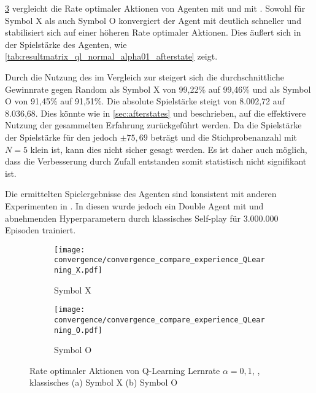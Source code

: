 \cref{fig:convergence_compare_experience_QLearning} vergleicht die Rate optimaler Aktionen von Agenten mit \qtable und mit \wtable. 
Sowohl für Symbol X als auch Symbol O konvergiert der Agent mit \wtable deutlich schneller und stabilisiert sich auf einer höheren Rate optimaler Aktionen. 
Dies äußert sich in der Spielstärke des Agenten, wie \cref{tab:resultmatrix_ql_normal_alpha01_afterstate} zeigt.

Durch die Nutzung des \wtable im Vergleich zur \qtable steigert sich die durchschnittliche Gewinnrate gegen Random als Symbol X von 99,22\% auf 99,46\% und als Symbol O von 91,45\% auf 91,51\%.
Die absolute Spielstärke steigt von 8.002,72 auf 8.036,68. 
Dies könnte wie in \cref{sec:afterstates} und \cite[S. 136f.]{suttonReinforcementLearningIntroduction2018} beschrieben, auf die effektivere Nutzung der gesammelten Erfahrung zurückgeführt werden.
Da die Spielstärke der Spielstärke für den \qtable jedoch $\pm 75,69$ beträgt und die Stichprobenanzahl mit $N=5$ klein ist, kann dies nicht sicher gesagt werden.
Es ist daher auch möglich, dass die Verbesserung durch Zufall entstanden somit statistisch nicht signifikant ist.

Die ermittelten Spielergebnisse des \qlearning Agenten sind konsistent mit anderen Experimenten in \cite{mirnovi.QLearningTicTacToe2020}. 
In diesen wurde jedoch ein Double \qlearning Agent mit \qtable und abnehmenden Hyperparametern durch klassisches Self-play für 3.000.000 Episoden trainiert.

\begin{figure}
\centering
\begin{subfigure}[b]{0.75\textwidth}
    \centering
   \texttt{[image: convergence/convergence\_compare\_experience\_QLearning\_X.pdf]}
   \caption{Symbol X}
   \label{fig:convergence_compare_experience_QLearning_X} 
\end{subfigure}

\begin{subfigure}[b]{0.75\textwidth}
    \centering
   \texttt{[image: convergence/convergence\_compare\_experience\_QLearning\_O.pdf]}
   \caption{Symbol O}
   \label{fig:convergence_compare_experience_QLearning_O}
\end{subfigure}

\caption[Rate optimaler Aktionen bester Q-Learning Agent, \wtable, klassisches \splay]{Rate optimaler Aktionen von Q-Learning Lernrate $\alpha=0,1$, \wtable, klassisches \splay (a) Symbol X (b) Symbol O}
\label{fig:convergence_compare_experience_QLearning}
\end{figure}

